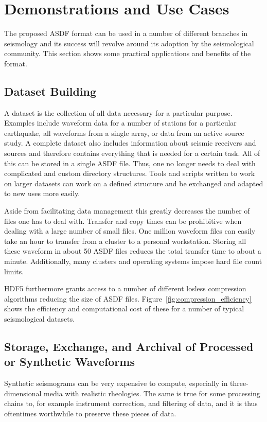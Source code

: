 \section{Demonstrations and Use Cases}

The proposed ASDF format can be used in a number of different branches in
seismology and its success will revolve around its adoption by the
seismological community. This section shows some practical applications and
benefits of the format.


\subsection{Dataset Building}

A dataset is the collection of all data necessary for a particular purpose.
Examples include waveform data for a number of stations for a particular
earthquake, all waveforms from a single array, or data from an active source
study. A complete dataset also includes information about seismic receivers and
sources and therefore contains everything that is needed for a certain task.
All of this can be stored in a single ASDF file. Thus, one no longer needs to
deal with complicated and custom directory structures. Tools and scripts
written to work on larger datasets can work on a defined structure and be
exchanged and adapted to new uses more easily.

Aside from facilitating data management this greatly decreases the number of
files one has to deal with. Transfer and copy times can be prohibitive when
dealing with a large number of small files. One million waveform files can
easily take an hour to transfer from a cluster to a personal workstation.
Storing all these waveform in about 50 ASDF files reduces the total transfer
time to about a minute. Additionally, many clusters and operating systems
impose hard file count limits.

HDF5 furthermore grants access to a number of different losless compression
algorithms reducing the size of ASDF files.
Figure~\ref{fig:compression_efficiency} shows the efficiency and computational
cost of these for a number of typical seismological datasets.


\subsection{Storage, Exchange, and Archival of Processed or Synthetic Waveforms}

Synthetic seismograms can be very expensive to compute, especially in
three-dimensional media with realistic rheologies. The same is true for some
processing chains to, for example instrument correction, and filtering of data, and it
is thus oftentimes worthwhile to preserve these pieces of data.

